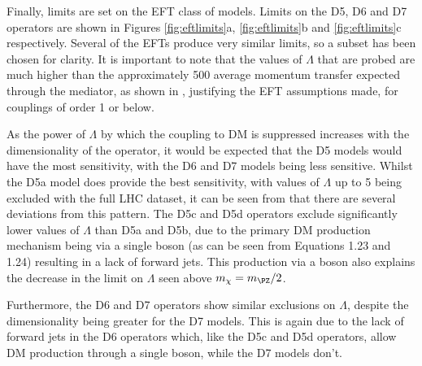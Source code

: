 Finally, limits are set on the \ac{EFT} class of models. Limits on the D5, D6 and D7 operators are shown in Figures \ref{fig:eftlimits}a, \ref{fig:eftlimits}b and \ref{fig:eftlimits}c respectively. Several of the \ac{EFT}s produce very similar limits, so a subset has been chosen for clarity. It is important to note that the values of $\Lambda$ that are probed are much higher than the approximately 500 \GeV average momentum transfer expected through the mediator, as shown in , justifying the \ac{EFT} assumptions made, for couplings of order 1 or below.

As the power of $\Lambda$ by which the coupling to \ac{DM} is suppressed increases with the dimensionality of the operator, it would be expected that the D5 models would have the most sensitivity, with the D6 and D7 models being less sensitive. Whilst the D5a model does provide the best sensitivity, with values of $\Lambda$ up to 5 \TeV being excluded with the full LHC dataset, it can be seen from  that there are several deviations from this pattern. The D5c and D5d operators exclude significantly lower values of $\Lambda$ than D5a and D5b, due to the primary \ac{DM} production mechanism being via a single \PZ boson (as can be seen from Equations 1.23 and 1.24) resulting in a lack of forward jets. This production via a \PZ boson also explains the decrease in the limit on $\Lambda$ seen above $m_{\chi}=m_{\PZ}/2$.

Furthermore, the D6 and D7 operators show similar exclusions on $\Lambda$, despite the dimensionality being greater for the D7 models. This is again due to the lack of forward jets in the D6 operators which, like the D5c and D5d operators, allow \ac{DM} production through a single \PZ boson, while the D7 models don't.

